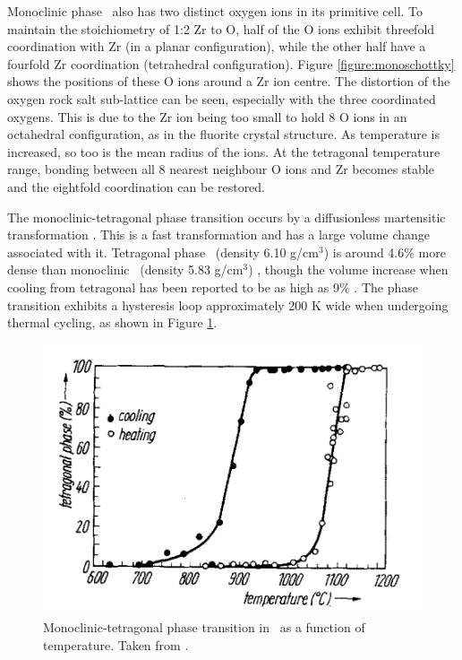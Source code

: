 Monoclinic phase \zirconia\ also has two distinct oxygen ions in its primitive cell. To maintain the stoichiometry of 1:2 Zr to O, half of the O ions exhibit threefold coordination with Zr (in a planar configuration), while the other half have a fourfold Zr coordination (tetrahedral configuration). Figure \ref{figure:monoschottky} shows the positions of these O ions around a Zr ion centre. The distortion of the oxygen rock salt sub-lattice can be seen, especially with the three coordinated oxygens. This is due to the Zr ion being too small to hold 8 O ions in an octahedral configuration, as in the fluorite crystal structure. As temperature is increased, so too is the mean radius of the ions. At the tetragonal temperature range, bonding between all 8 nearest neighbour O ions and Zr becomes stable and the eightfold coordination can be restored. 

The monoclinic-tetragonal phase transition occurs by a diffusionless martensitic transformation \cite{Subbarao1974}. This is a fast transformation and has a large volume change associated with it. Tetragonal phase \zirconia\ (density 6.10 g/cm$^{3}$) is around 4.6\% more dense than monoclinic \zirconia\ (density 5.83 g/cm$^{3}$) \cite{McCullough2002}, though the volume increase when cooling from tetragonal has been reported to be as high as 9\% \cite{Gupta1977}. The phase transition exhibits a hysteresis loop approximately 200 K wide when undergoing thermal cycling, as shown in Figure \ref{figure:hysteresis_monotet}.

\begin{figure}[htp] %
\centering
\includegraphics[width=12cm]{images/hysteresis_monotet.png}
\caption[Monoclinic-tetragonal phase transition in \zirconia\ as a function of temperature.]{Monoclinic-tetragonal phase transition in \zirconia\ as a function of temperature. Taken from \cite{WOLTEN1963}.}
\label{figure:hysteresis_monotet}
\end{figure}

